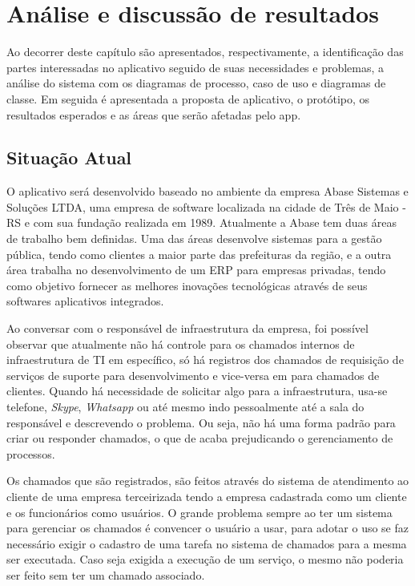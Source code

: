 \chapter{Análise e discussão de resultados}\label{chap:Results}

Ao decorrer deste capítulo são apresentados, respectivamente, a identificação das partes interessadas no aplicativo seguido de suas necessidades e problemas, a análise do sistema com os diagramas de processo, caso de uso e diagramas de classe. Em seguida é apresentada a proposta de aplicativo, o protótipo, os resultados esperados e as áreas que serão afetadas pelo app.

\section{Situação Atual}
O aplicativo será desenvolvido baseado no ambiente da empresa Abase Sistemas e Soluções LTDA, uma empresa de software localizada na cidade de Três de Maio - RS e com sua fundação realizada em 1989. Atualmente a Abase tem duas áreas de trabalho bem definidas. Uma das áreas desenvolve sistemas para a gestão pública, tendo como clientes a maior parte das prefeituras da região, e a outra área trabalha no desenvolvimento de um ERP para empresas privadas, tendo como objetivo fornecer as melhores inovações tecnológicas através de seus softwares aplicativos integrados. 

Ao conversar com o responsável de infraestrutura da empresa, foi possível observar que atualmente não há controle para os chamados internos de infraestrutura de TI em específico, só há registros dos chamados de requisição de serviços de suporte para desenvolvimento e vice-versa em para chamados de clientes. Quando há necessidade de solicitar algo para a infraestrutura, usa-se telefone, \textit{Skype}, \textit{Whatsapp} ou até mesmo indo pessoalmente até a sala do responsável e descrevendo o problema. Ou seja, não há uma forma padrão para criar ou responder chamados, o que de acaba prejudicando o gerenciamento de processos.

Os chamados que são registrados, são feitos através do sistema de atendimento ao cliente de uma empresa terceirizada tendo a empresa cadastrada como um cliente e os funcionários como usuários. O grande problema sempre ao ter um sistema para gerenciar os chamados é convencer o usuário a usar, para adotar o uso se faz necessário exigir o cadastro de uma tarefa no sistema de chamados para a mesma ser executada. Caso seja exigida a execução de um serviço, o mesmo não poderia ser feito sem ter um chamado associado. 

